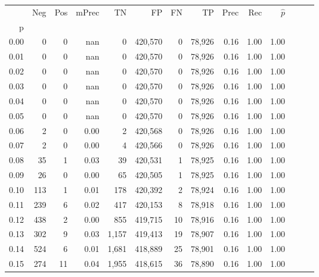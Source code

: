 \begin{tabular}{rrrrrrrrrrrrrr}
\toprule
{} &     Neg &    Pos & mPrec &       TN &       FP &      FN &      TP &  Prec &   Rec & $\hat{p}$ \\
p    &         &        &       &          &          &         &         &       &       &           \\
\midrule
0.00 &       0 &      0 &   nan &        0 &  420,570 &       0 &  78,926 &  0.16 &  1.00 &      1.00 \\
0.01 &       0 &      0 &   nan &        0 &  420,570 &       0 &  78,926 &  0.16 &  1.00 &      1.00 \\
0.02 &       0 &      0 &   nan &        0 &  420,570 &       0 &  78,926 &  0.16 &  1.00 &      1.00 \\
0.03 &       0 &      0 &   nan &        0 &  420,570 &       0 &  78,926 &  0.16 &  1.00 &      1.00 \\
0.04 &       0 &      0 &   nan &        0 &  420,570 &       0 &  78,926 &  0.16 &  1.00 &      1.00 \\
0.05 &       0 &      0 &   nan &        0 &  420,570 &       0 &  78,926 &  0.16 &  1.00 &      1.00 \\
0.06 &       2 &      0 &  0.00 &        2 &  420,568 &       0 &  78,926 &  0.16 &  1.00 &      1.00 \\
0.07 &       2 &      0 &  0.00 &        4 &  420,566 &       0 &  78,926 &  0.16 &  1.00 &      1.00 \\
0.08 &      35 &      1 &  0.03 &       39 &  420,531 &       1 &  78,925 &  0.16 &  1.00 &      1.00 \\
0.09 &      26 &      0 &  0.00 &       65 &  420,505 &       1 &  78,925 &  0.16 &  1.00 &      1.00 \\
0.10 &     113 &      1 &  0.01 &      178 &  420,392 &       2 &  78,924 &  0.16 &  1.00 &      1.00 \\
0.11 &     239 &      6 &  0.02 &      417 &  420,153 &       8 &  78,918 &  0.16 &  1.00 &      1.00 \\
0.12 &     438 &      2 &  0.00 &      855 &  419,715 &      10 &  78,916 &  0.16 &  1.00 &      1.00 \\
0.13 &     302 &      9 &  0.03 &    1,157 &  419,413 &      19 &  78,907 &  0.16 &  1.00 &      1.00 \\
0.14 &     524 &      6 &  0.01 &    1,681 &  418,889 &      25 &  78,901 &  0.16 &  1.00 &      1.00 \\
0.15 &     274 &     11 &  0.04 &    1,955 &  418,615 &      36 &  78,890 &  0.16 &  1.00 &      1.00 \\

\end{tabular}
